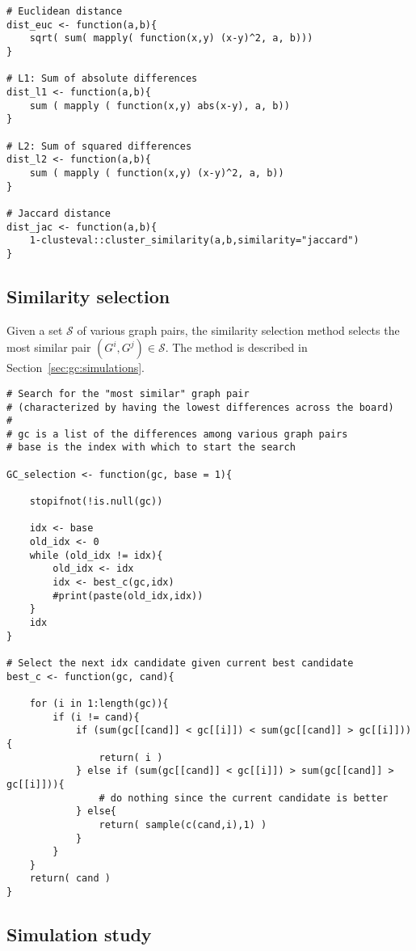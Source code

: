 {\begin{lstlisting}
# Euclidean distance
dist_euc <- function(a,b){
	sqrt( sum( mapply( function(x,y) (x-y)^2, a, b)))
}

# L1: Sum of absolute differences
dist_l1 <- function(a,b){
	sum ( mapply ( function(x,y) abs(x-y), a, b))
}

# L2: Sum of squared differences
dist_l2 <- function(a,b){
	sum ( mapply ( function(x,y) (x-y)^2, a, b))
}

# Jaccard distance
dist_jac <- function(a,b){
	1-clusteval::cluster_similarity(a,b,similarity="jaccard")
}
\end{lstlisting}

}


\subsection{Similarity selection}
\label{sec:appendicies:gc:similarity}

Given a set $\mathcal{S}$ of various graph pairs, the similarity selection 
method selects the most similar pair $(G^i,G^j) \in \mathcal{S}$. The method is 
described in Section~\ref{sec:gc:simulations}.

{
\begin{lstlisting}
# Search for the "most similar" graph pair
# (characterized by having the lowest differences across the board)
#
# gc is a list of the differences among various graph pairs
# base is the index with which to start the search

GC_selection <- function(gc, base = 1){
	
	stopifnot(!is.null(gc))
	
	idx <- base
	old_idx <- 0
	while (old_idx != idx){
		old_idx <- idx
		idx <- best_c(gc,idx)
		#print(paste(old_idx,idx))
	}
	idx
}

# Select the next idx candidate given current best candidate
best_c <- function(gc, cand){

	for (i in 1:length(gc)){
		if (i != cand){
			if (sum(gc[[cand]] < gc[[i]]) < sum(gc[[cand]] > gc[[i]])){
				return( i )
			} else if (sum(gc[[cand]] < gc[[i]]) > sum(gc[[cand]] > gc[[i]])){
				# do nothing since the current candidate is better
			} else{
				return( sample(c(cand,i),1) )
			}
		}
	}
	return( cand )  
}
\end{lstlisting}
}


\subsection{Simulation study}
\label{sec:appendicies:gc:simulations}

